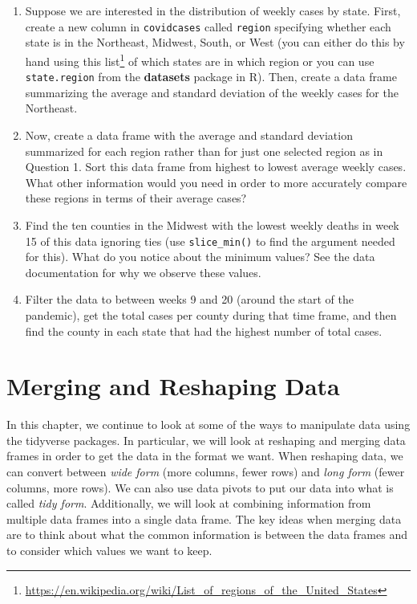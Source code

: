 \documentclass[
  letterpaper,
]{krantz}
\renewcommand{\href}[2]{#2\footnote{\url{#1}}}
\begin{document}
\begin{enumerate}
\def\labelenumi{\arabic{enumi}.}
\item
  Suppose we are interested in the distribution of weekly cases by
  state. First, create a new column in \texttt{covidcases} called
  \texttt{region} specifying whether each state is in the Northeast,
  Midwest, South, or West (you can either do this by hand using
  \href{https://en.wikipedia.org/wiki/List_of_regions_of_the_United_States}{this
  list} of which states are in which region or you can use
  \texttt{state.region} from the \textbf{datasets} package in R). Then,
  create a data frame summarizing the average and standard deviation of
  the weekly cases for the Northeast.
\item
  Now, create a data frame with the average and standard deviation
  summarized for each region rather than for just one selected region as
  in Question 1. Sort this data frame from highest to lowest average
  weekly cases. What other information would you need in order to more
  accurately compare these regions in terms of their average cases?
\item
  Find the ten counties in the Midwest with the lowest weekly deaths in
  week 15 of this data ignoring ties (use \texttt{slice\_min()} to find
  the argument needed for this). What do you notice about the minimum
  values? See the data documentation for why we observe these values.
\item
  Filter the data to between weeks 9 and 20 (around the start of the
  pandemic), get the total cases per county during that time frame, and
  then find the county in each state that had the highest number of
  total cases.
\end{enumerate}


\hypertarget{sec-merging-reshaping}{%
\chapter{Merging and Reshaping Data}\label{sec-merging-reshaping}}

In this chapter, we continue to look at some of the ways to manipulate
data using the tidyverse packages. In particular, we will look at
reshaping and merging data frames in order to get the data in the format
we want. When reshaping data, we can convert between \emph{wide form}
(more columns, fewer rows) and \emph{long form} (fewer columns, more
rows). We can also use data pivots to put our data into what is called
\emph{tidy form}. Additionally, we will look at combining information
from multiple data frames into a single data frame. The key ideas when
merging data are to think about what the common information is between
the data frames and to consider which values we want to keep.
\end{document}
